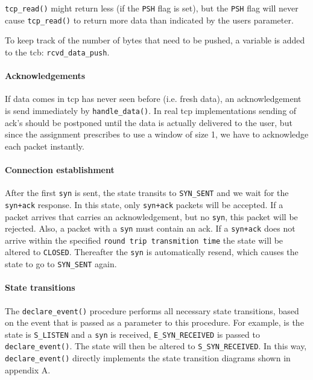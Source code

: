 \documentclass[11pt]{article}
\begin{document}
    \lstinline|tcp_read()| might return less (if the \lstinline|PSH| flag is set), but 
    the \lstinline|PSH| flag 
    will never cause \lstinline|tcp_read()| to return more 
    data than indicated by the users parameter.
    
    To keep track of the number of bytes that need to be pushed, a variable is 
    added to the tcb: \lstinline|rcvd_data_push|.

\paragraph{Acknowledgements}
    If data comes in tcp has never seen before (i.e. fresh data), an 
    acknowledgement is send
    immediately by \lstinline|handle_data()|. In real tcp implementations sending of
     ack's 
    should be postponed until the data is actually delivered to the user, 
    but since the assignment prescribes to use a window of size 1, we have to 
    acknowledge each packet instantly.

\paragraph{Connection establishment}
    After the first \lstinline|syn| is sent, 
    the state transits to \lstinline|SYN_SENT| 
    and we wait for the \lstinline|syn+ack| response. In this state, only 
    \lstinline|syn+ack| packets will be accepted. If a packet arrives that carries an
    acknowledgement, but no \lstinline|syn|, this packet will be rejected.
    Also, a packet with a \lstinline|syn| must contain an ack. 
    If a \lstinline|syn+ack| does not arrive within the specified 
    \lstinline|round trip transmition time| the state will be altered to 
    \lstinline|CLOSED|. Thereafter the \lstinline|syn| is automatically 
    resend, which causes the state to go to \lstinline|SYN_SENT| again.
    
    
\paragraph{State transitions}
    The \lstinline|declare_event()| procedure performs all necessary state 
    transitions, based on the event that is passed as a parameter to this 
    procedure. For example, 
    is the state is \lstinline|S_LISTEN| and a \lstinline|syn| is received, 
    \lstinline|E_SYN_RECEIVED| is passed to \lstinline|declare_event()|. The state will 
    then be altered to \lstinline|S_SYN_RECEIVED|. In this way, \lstinline|declare_event()| directly implements the state 
    transition diagrams shown in appendix A.
    
\end{document}

